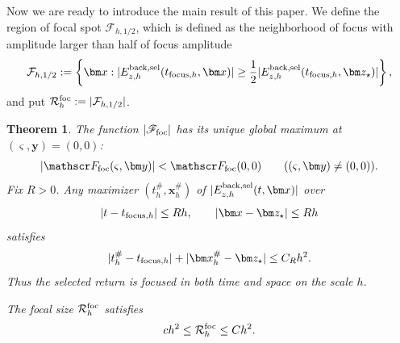 \documentclass[11pt,reqno]{amsart}
\newtheorem{theorem}{Theorem}[section]
\numberwithin{equation}{section}
\begin{document}
Now we are ready to introduce the main result of this paper. We define the region of focal spot $\mathcal F_{h,1/2}$, which is defined as the neighborhood of focus with amplitude larger than half of focus amplitude
\begin{equation*}
 \mathcal F_{h,1/2}:=\left\{\bm x: |E_{z,h}^{\rm back,sel}(t_{{\rm focus},h},\bm x)|\ge\frac12|E_{z,h}^{\rm back,sel}(t_{{\rm focus},h},\bm z_\star)|\right\},
\end{equation*}
and put $\mathcal R_h^{\rm foc}:=|\mathcal F_{h,1/2}|$.
\begin{theorem}
The function $|\mathscr F_{\rm foc}|$ has its unique global maximum at
$(\varsigma,\bm y)=(0,0)$:
\begin{equation}\label{eq:spacetime-strict-maximum}
 |\mathscr F_{\rm foc}(\varsigma,\bm y)|<\mathscr F_{\rm foc}(0,0)\qquad ((\varsigma,\bm y)\ne(0,0)).
\end{equation}
Fix $R>0$. Any maximizer $(t_h^\#,\bm x_h^\#)$ of $|E_{z,h}^{\rm back,sel}(t,\bm x)|$ over
\begin{equation*}
 |t-t_{{\rm focus},h}|\le Rh,
 \qquad
 |\bm x-\bm z_\star|\le Rh
\end{equation*}
satisfies
\begin{equation}\label{eq:focus-error}
 |t_h^\#-t_{{\rm focus},h}|+|\bm x_h^\#-\bm z_\star|\le C_Rh^2.
\end{equation}
Thus the selected return is focused in both time and space on the scale $h$.

The focal size $\mathcal R_h^{\rm foc}$ satisfies
\begin{equation}\label{eq:focal-scale}
 ch^2\le\mathcal R_h^{\rm foc}\le Ch^2.
\end{equation}
\end{theorem}
\end{document}
